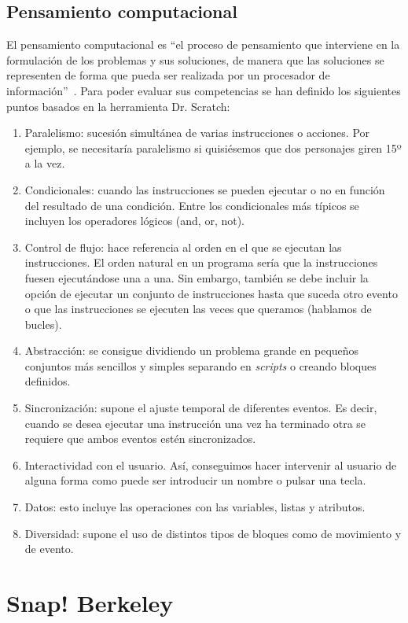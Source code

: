 \documentclass[a4paper, 12pt]{book}
\begin{document}
\subsection{Pensamiento computacional}
El pensamiento computacional es ``el proceso de pensamiento que interviene en la formulación de los problemas y sus soluciones, de manera que las soluciones se representen de forma que pueda ser realizada por un procesador de información''~\cite{wing2011research}. Para poder evaluar sus competencias se han definido los siguientes puntos basados en la herramienta Dr. Scratch:
\begin{enumerate}[1)]
    \item Paralelismo: sucesión simultánea de varias instrucciones o acciones. Por ejemplo, se necesitaría paralelismo si quisiésemos que dos personajes giren 15º a la vez.
    \item Condicionales: cuando las instrucciones se pueden ejecutar o no en función del resultado de una condición. Entre los condicionales más típicos se incluyen los operadores lógicos (and, or, not).
    \item Control de flujo: hace referencia al orden en el que se ejecutan las instrucciones. El orden natural en un programa sería que la instrucciones fuesen ejecutándose una a una. Sin embargo, también se debe incluir la opción de ejecutar un conjunto de instrucciones hasta que suceda otro evento o que las instrucciones se ejecuten las veces que queramos (hablamos de bucles).
    \item Abstracción: se consigue dividiendo un problema grande en pequeños conjuntos más sencillos y simples separando en \emph{scripts} o creando bloques definidos.
    \item Sincronización: supone el ajuste temporal de diferentes eventos. Es decir, cuando se desea ejecutar una instrucción una vez ha terminado otra se requiere que ambos eventos estén sincronizados.
    \item Interactividad con el usuario. Así, conseguimos hacer intervenir al usuario de alguna forma como puede ser introducir un nombre o pulsar una tecla.
    \item Datos: esto incluye las operaciones con las variables, listas y atributos.
    \item Diversidad: supone el uso de distintos tipos de bloques como de movimiento y de evento.
\end{enumerate}

\section{Snap! Berkeley}
\end{document}

